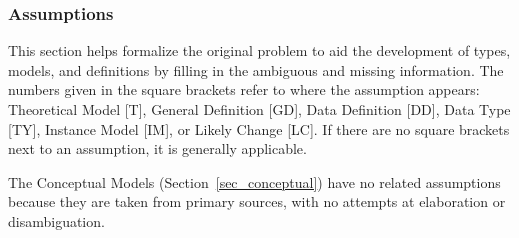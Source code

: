 \subsubsection{Assumptions}\label{sec_assumptions}
This section helps formalize the original problem to aid the development of 
types, models, and definitions by filling in the ambiguous and missing 
information. The numbers given in the square brackets refer to where the 
assumption appears: Theoretical Model [T], General Definition [GD], Data 
Definition [DD], Data Type [TY], Instance Model [IM], or Likely Change [LC]. If 
there are no square brackets next to an assumption, it is generally applicable.

The Conceptual Models (Section~\ref{sec_conceptual}) have no related 
assumptions because they are taken from primary sources, with no attempts at 
elaboration or disambiguation. 


